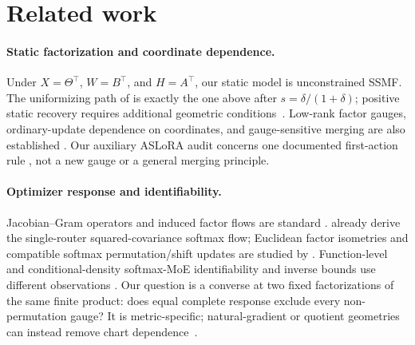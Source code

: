 \section{Related work}
\label{sec:related-work}

\paragraph{Static factorization and coordinate dependence.}
Under $X=\Theta^\top$, $W=B^\top$, and $H=A^\top$, our static model is
unconstrained SSMF. The uniformizing path of
\citet[Sec.~IV-A]{vuthanh2023bounded} is exactly the one above after
$s=\delta/(1+\delta)$; positive static recovery requires additional
geometric conditions~\citep{fu2018identifiability,abdolali2021simplex}.
Low-rank factor gauges, ordinary-update dependence on coordinates, and
gauge-sensitive merging are also established
\citep{yen2025lora,zheng2026loras,gong2026twistedmerge}.
Our auxiliary ASLoRA audit concerns one documented first-action rule
\citep{hu2024aslorav2}, not a new gauge or a general merging principle.

\paragraph{Optimizer response and identifiability.}
Jacobian--Gram operators and induced factor flows are standard
\citep{jacot2018neural,marcotte2026intrinsic}.
\citet[Lem.~D.2]{varre2026gradient} already derive the single-router
squared-covariance softmax flow; Euclidean factor isometries and compatible
softmax permutation/shift updates are studied by
\citet{singh2026loss,lau2026symmetry}.
Function-level and conditional-density softmax-MoE identifiability and
inverse bounds use different observations
\citep{tran2025linear,nguyen2023demystifying}.
Our question is a converse at two fixed factorizations of the same finite
product: does equal complete response exclude every non-permutation gauge?
It is metric-specific; natural-gradient or quotient geometries can instead
remove chart dependence~\citep{vanoostrum2023invariance,mishra2014fixedrank}.

